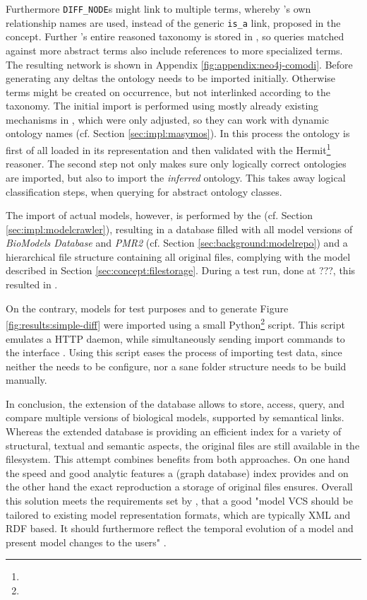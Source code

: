Furthermore \texttt{DIFF\_NODE}s might link to multiple \comodi terms, whereby \comodi's own relationship names are used, instead of the generic \texttt{is\_a} link, proposed in the concept.
Further \comodi's entire reasoned taxonomy is stored in \masymos, so queries matched against more abstract terms also include references to more specialized terms. The resulting network is shown in Appendix \ref{fig:appendix:neo4j-comodi}.
Before generating any deltas the \comodi ontology needs to be imported initially. Otherwise terms might be created on occurrence, but not interlinked according to the taxonomy.
The initial import is performed using mostly already existing mechanisms in \masymos, which were only adjusted, so they can work with dynamic ontology names (cf. Section \ref{sec:impl:masymos}). In this process the ontology is first of all loaded in its \owl representation and then validated with the Hermit\footnote{} reasoner. The second step not only makes sure only logically correct ontologies are imported, but also to import the \emph{inferred} ontology. This takes away logical classification steps, when querying for abstract ontology classes.

The import of actual models, however, is performed by the \modelcrawler (cf. Section \ref{sec:impl:modelcrawler}), resulting in a \masymos database filled with all model versions of \emph{BioModels Database} and \emph{PMR2} (cf. Section \ref{sec:background:modelrepo}) and a hierarchical file structure containing all original files, complying with the model described in Section \ref{sec:concept:filestorage}.
During a test run, done at ???, this resulted in .

On the contrary, models for test purposes and to generate Figure \ref{fig:results:simple-diff} were imported using a small Python\footnote{} script. This script emulates a HTTP daemon, while simultaneously sending import commands to the \masymos \rest interface \morre. Using this script eases the process of importing test data, since neither the \modelcrawler needs to be configure, nor a sane folder structure needs to be build manually.

In conclusion, the extension of the \masymos database allows to store, access, query, and compare multiple versions of biological models, supported by semantical links. Whereas the extended \masymos database is providing an efficient index for a variety of structural, textual and semantic aspects, the original files are still available in the filesystem. This attempt combines benefits from both approaches. On one hand the speed and good analytic features a (graph database) index provides and on the other hand the exact reproduction a storage of original files ensures.
Overall this solution meets the requirements set by \citet{Waltemath2013}, that a good "model VCS should be tailored to existing model  representation formats, which are typically XML and RDF based. It should furthermore reflect the temporal evolution of a model and present model changes to the users" \citep{Waltemath2013}.

